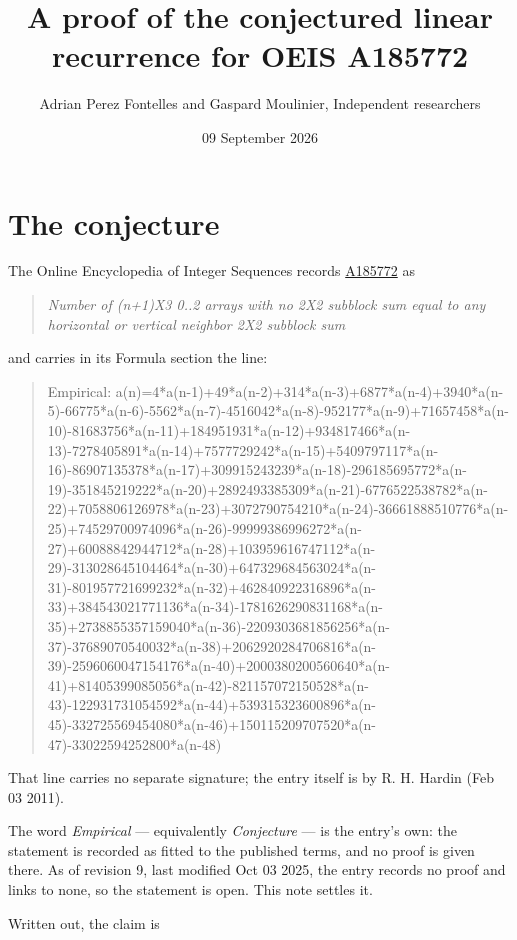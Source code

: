 \documentclass[11pt]{article}
\title{A proof of the conjectured linear recurrence for OEIS A185772}
\author{Adrian Perez Fontelles and Gaspard Moulinier, Independent researchers}
\date{09 September 2026}
\theoremstyle{definition}
\begin{document}
\maketitle
\section{The conjecture}

The Online Encyclopedia of Integer Sequences records \href{https://oeis.org/A185772}{A185772} as

\begin{quote}\itshape Number of (n+1)X3 0..2 arrays with no 2X2 subblock sum equal to any horizontal or vertical neighbor 2X2 subblock sum\end{quote}

and carries in its Formula section the line:

\begin{quote}\ttfamily Empirical: a(n)=4*a(n-1)+49*a(n-2)+314*a(n-3)+6877*a(n-4)+3940*a(n-5)-66775*a(n-6)-5562*a(n-7)-4516042*a(n-8)-952177*a(n-9)+71657458*a(n-10)-81683756*a(n-11)+184951931*a(n-12)+934817466*a(n-13)-7278405891*a(n-14)+7577729242*a(n-15)+5409797117*a(n-16)-86907135378*a(n-17)+309915243239*a(n-18)-296185695772*a(n-19)-351845219222*a(n-20)+2892493385309*a(n-21)-6776522538782*a(n-22)+7058806126978*a(n-23)+3072790754210*a(n-24)-36661888510776*a(n-25)+74529700974096*a(n-26)-99999386996272*a(n-27)+60088842944712*a(n-28)+103959616747112*a(n-29)-313028645104464*a(n-30)+647329684563024*a(n-31)-801957721699232*a(n-32)+462840922316896*a(n-33)+384543021771136*a(n-34)-1781626290831168*a(n-35)+2738855357159040*a(n-36)-2209303681856256*a(n-37)-37689070540032*a(n-38)+2062920284706816*a(n-39)-2596060047154176*a(n-40)+2000380200560640*a(n-41)+81405399085056*a(n-42)-821157072150528*a(n-43)-122931731054592*a(n-44)+539315323600896*a(n-45)-332725569454080*a(n-46)+150115209707520*a(n-47)-33022594252800*a(n-48)\end{quote}

That line carries no separate signature; the entry itself is by R. H. Hardin (Feb 03 2011).

The word {\itshape Empirical} --- equivalently {\itshape Conjecture} --- is the entry's own: the statement is recorded as fitted to the published terms, and no proof is given there. As of revision 9, last modified Oct 03 2025, the entry records no proof and links to none, so the statement is open. This note settles it.

Written out, the claim is
\end{document}
